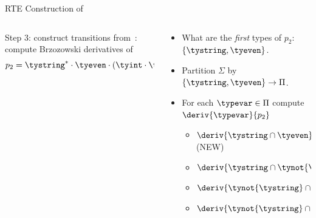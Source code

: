 \begin{frame}{RTE Construction of }
  \begin{columns}
    \begin{column}{0.45\textwidth}
      Step 3: construct transitions from~: compute Brzozowski derivatives of 
      \[p_2=\tystring^{*}\cdot \tyeven \cdot(\tyint \cdot \tystring^{*} \cdot \tyeven)^{*}\,.\]

    \end{column}
    \begin{column}{0.55\textwidth}
      \begin{itemize}
      \item<1->{What are the \emph{first} types of $p_2$: $\{\tystring,\tyeven\}$.}
      \item<2->{Partition $\Sigma$ by $\{\tystring,\tyeven\} \to \Pi$.}
      \item<3->{For each $\typevar \in \Pi$ compute $\deriv{\typevar}{p_2}$
        \begin{itemize}
        \item $\deriv{\tystring\cap\tyeven}{p_2} = p_3$ (NEW)
        \item $\deriv{\tystring\cap\tynot{\tyeven}}{p_2} = p_2$
        \item $\deriv{\tynot{\tystring}\cap\tyeven}{p_2} = p_0$
        \item $\deriv{\tynot{\tystring}\cap\tynot{\tyeven}}{p_2} = p_1$
        \end{itemize}
      }
      \end{itemize}
    \end{column}
  \end{columns}
\end{frame}

